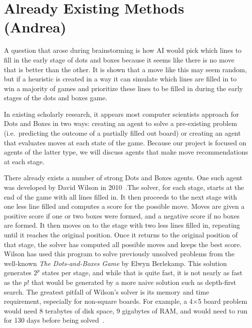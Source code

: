 \documentclass[12pt]{article}
\begin{document}
    \section*{Already Existing Methods (Andrea)}
    
    A question that arose during brainstorming is how AI would pick which lines to fill in the early stage of dots and boxes because it seems like there is no move that is better than the other. It is shown that a move like this may seem random, but if a heuristic is created in a way it can simulate which lines are filled in to win a majority of games and prioritize these lines to be filled in during the early stages of the dots and boxes game.~\cite{Minimax}
           
    In existing scholarly research, it appears most computer scientists approach for Dots and Boxes in two ways: creating an agent to solve a pre-existing problem (i.e.\ predicting the outcome of a partially filled out board) or creating an agent that evaluates moves at each state of the game. Because our project is focused on agents of the latter type, we will discuss agents that make move recommendations at each stage. 
        
    There already exists a number of strong Dots and Boxes agents. One such agent was developed by David Wilson in 2010~\cite{Barker_Korf_2012}.The solver, for each stage, starts at the end of the game with all lines filled in. It then proceeds to the next stage with one less line filled and computes a score for the possible move. Moves are given a positive score if one or two boxes were formed, and a negative score if no boxes are formed. It then moves on to the stage with two less lines filled in, repeating until it reaches the original position. Once it returns to the original position of that stage, the solver has computed all possible moves and keeps the best score. Wilson has used this program to solve previously unsolved problems from the well-known \emph{The Dots-and-Boxes Game} by Elwyn Berlekamp. This solution generates \(2^p\) states per stage, and while that is quite fast, it is not nearly as fast as the \(p!\) that would be generated by a more naive solution such as depth-first search. The greatest pitfall of Wilson’s solver is its memory and time requirement, especially for non-square boards. For example, a 4$\times$5 board problem would need 8 terabytes of disk space, 9 gigabytes of RAM, and would need to run for 130 days before being solved~\cite{wlson_2002}.
    
\end{document}
